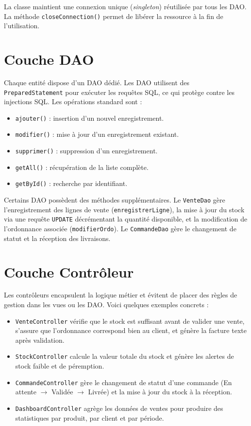 \documentclass[12pt,a4paper]{report}
\begin{document}
La classe maintient une connexion unique (\emph{singleton}) réutilisée par tous les DAO. La méthode \texttt{closeConnection()} permet de libérer la ressource à la fin de l'utilisation.

\section{Couche DAO}

Chaque entité dispose d'un DAO dédié. Les DAO utilisent des \texttt{PreparedStatement} pour exécuter les requêtes SQL, ce qui protège contre les injections SQL. Les opérations standard sont :

\begin{itemize}[nosep]
  \item \texttt{ajouter()} : insertion d'un nouvel enregistrement.
  \item \texttt{modifier()} : mise à jour d'un enregistrement existant.
  \item \texttt{supprimer()} : suppression d'un enregistrement.
  \item \texttt{getAll()} : récupération de la liste complète.
  \item \texttt{getById()} : recherche par identifiant.
\end{itemize}

Certains DAO possèdent des méthodes supplémentaires. Le \texttt{VenteDao} gère l'enregistrement des lignes de vente (\texttt{enregistrerLigne}), la mise à jour du stock via une requête \texttt{UPDATE} décrémentant la quantité disponible, et la modification de l'ordonnance associée (\texttt{modifierOrdo}). Le \texttt{CommandeDao} gère le changement de statut et la réception des livraisons.

\section{Couche Contrôleur}

Les contrôleurs encapsulent la logique métier et évitent de placer des règles de gestion dans les vues ou les DAO. Voici quelques exemples concrets :

\begin{itemize}[nosep]
  \item \texttt{VenteController} vérifie que le stock est suffisant avant de valider une vente, s'assure que l'ordonnance correspond bien au client, et génère la facture texte après validation.
  \item \texttt{StockController} calcule la valeur totale du stock et génère les alertes de stock faible et de péremption.
  \item \texttt{CommandeController} gère le changement de statut d'une commande (En attente $\rightarrow$ Validée $\rightarrow$ Livrée) et la mise à jour du stock à la réception.
  \item \texttt{DashboardController} agrège les données de ventes pour produire des statistiques par produit, par client et par période.
\end{itemize}
\end{document}
